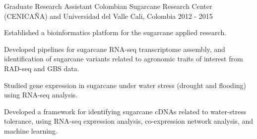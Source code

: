 \begin{cventries}
\vspace{\acvSectionContentTopSkip}
\cventry
{Graduate Research Assistant} %
{Colombian Sugarcane Research Center (CENICAÑA) and Universidad del Valle} %
{Cali, Colombia} %
{2012 - 2015} %
{ %
\begin{cvitems}
    \item {Established a bioinformatics platform for the sugarcane applied research.}
    \item {Developed pipelines for sugarcane RNA-seq transcriptome assembly, and identification of sugarcane variants related to agronomic traits of interest from RAD-seq and GBS data.}
    \item {Studied gene expression in sugarcane under water stress (drought and flooding) using RNA-seq analysis.}
    \item {Developed a framework for identifying sugarcane cDNAs related to water-stress tolerance, using RNA-seq expression analysis, co-expression network analysis, and machine learning.}
\end{cvitems}
\vspace{\acvDescAfterDutiesSkip}
}
\end{cventries}

